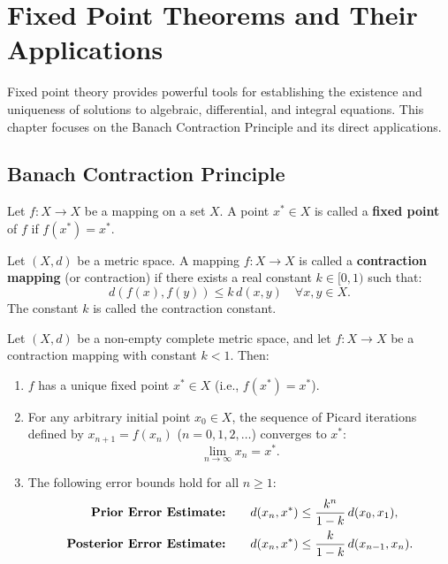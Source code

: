 \chapter{Fixed Point Theorems and Their Applications}
\label{chap:fixed_point_theorems}

Fixed point theory provides powerful tools for establishing the existence and uniqueness of solutions to algebraic, differential, and integral equations. This chapter focuses on the Banach Contraction Principle and its direct applications.

\section{Banach Contraction Principle}
\label{sec:banach_contraction}

\begin{definition}
Let $f: X \to X$ be a mapping on a set $X$. A point $x^* \in X$ is called a \textbf{fixed point} of $f$ if $f(x^*) = x^*$.
\end{definition}

\begin{definition}
Let $(X,d)$ be a metric space. A mapping $f: X \to X$ is called a \textbf{contraction mapping} (or contraction) if there exists a real constant $k \in [0, 1)$ such that:
\[
d(f(x), f(y)) \le k \, d(x,y) \quad \forall x, y \in X.
\]
The constant $k$ is called the contraction constant.
\end{definition}

\begin{theorem}
Let $(X,d)$ be a non-empty complete metric space, and let $f: X \to X$ be a contraction mapping with constant $k < 1$. Then:
\begin{enumerate}[label=\rm{(\roman*)}]
    \item $f$ has a unique fixed point $x^* \in X$ (i.e., $f(x^*) = x^*$).
    \item For any arbitrary initial point $x_0 \in X$, the sequence of Picard iterations defined by $x_{n+1} = f(x_n)$ ($n = 0, 1, 2, \dots$) converges to $x^*$:
    \[
    \lim_{n \to \infty} x_n = x^*.
    \]
    \item The following error bounds hold for all $n \ge 1$:
    \begin{align*}
    \text{\textbf{Prior Error Estimate:}} \qquad d(x_n, x^*) &\le \frac{k^n}{1-k} \, d(x_0, x_1), \\
    \text{\textbf{Posterior Error Estimate:}} \qquad d(x_n, x^*) &\le \frac{k}{1-k} \, d(x_{n-1}, x_n).
    \end{align*}
\end{enumerate}
\end{theorem}


